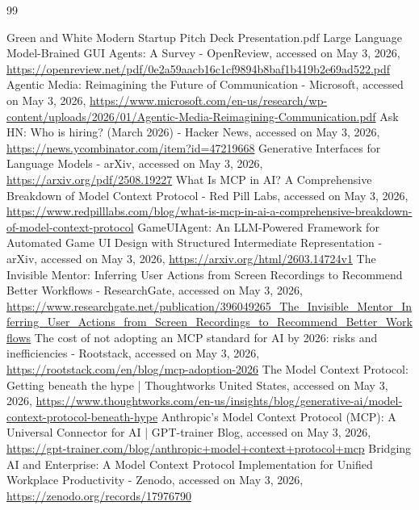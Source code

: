 \documentclass[12pt, a4paper]{report}
\begin{document}
\renewcommand{\bibname}{References}
\begin{thebibliography}{99}

 Green and White Modern Startup Pitch Deck Presentation.pdf
 Large Language Model-Brained GUI Agents: A Survey - OpenReview, accessed on May 3, 2026, \url{https://openreview.net/pdf/0e2a59aacb16c1cf9894b8baf1b419b2e69ad522.pdf}
 Agentic Media: Reimagining the Future of Communication - Microsoft, accessed on May 3, 2026, \url{https://www.microsoft.com/en-us/research/wp-content/uploads/2026/01/Agentic-Media-Reimagining-Communication.pdf}
 Ask HN: Who is hiring? (March 2026) - Hacker News, accessed on May 3, 2026, \url{https://news.ycombinator.com/item?id=47219668}
 Generative Interfaces for Language Models - arXiv, accessed on May 3, 2026, \url{https://arxiv.org/pdf/2508.19227}
 What Is MCP in AI? A Comprehensive Breakdown of Model Context Protocol - Red Pill Labs, accessed on May 3, 2026, \url{https://www.redpilllabs.com/blog/what-is-mcp-in-ai-a-comprehensive-breakdown-of-model-context-protocol}
 GameUIAgent: An LLM-Powered Framework for Automated Game UI Design with Structured Intermediate Representation - arXiv, accessed on May 3, 2026, \url{https://arxiv.org/html/2603.14724v1}
 The Invisible Mentor: Inferring User Actions from Screen Recordings to Recommend Better Workflows - ResearchGate, accessed on May 3, 2026, \url{https://www.researchgate.net/publication/396049265_The_Invisible_Mentor_Inferring_User_Actions_from_Screen_Recordings_to_Recommend_Better_Workflows}
 The cost of not adopting an MCP standard for AI by 2026: risks and inefficiencies - Rootstack, accessed on May 3, 2026, \url{https://rootstack.com/en/blog/mcp-adoption-2026}
 The Model Context Protocol: Getting beneath the hype | Thoughtworks United States, accessed on May 3, 2026, \url{https://www.thoughtworks.com/en-us/insights/blog/generative-ai/model-context-protocol-beneath-hype}
 Anthropic's Model Context Protocol (MCP): A Universal Connector for AI | GPT-trainer Blog, accessed on May 3, 2026, \url{https://gpt-trainer.com/blog/anthropic+model+context+protocol+mcp}
 Bridging AI and Enterprise: A Model Context Protocol Implementation for Unified Workplace Productivity - Zenodo, accessed on May 3, 2026, \url{https://zenodo.org/records/17976790}

\end{thebibliography}
\end{document}
